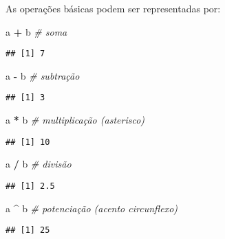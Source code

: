\documentclass[
]{book}
\newenvironment{Shaded}{\begin{snugshade}}{\end{snugshade}}
\newcommand{\CommentTok}[1]{\textcolor[rgb]{0.56,0.35,0.01}{\textit{#1}}}
\newcommand{\NormalTok}[1]{#1}
\newcommand{\OperatorTok}[1]{\textcolor[rgb]{0.81,0.36,0.00}{\textbf{#1}}}
\newcommand{\StringTok}[1]{\textcolor[rgb]{0.31,0.60,0.02}{#1}}
\begin{document}
As operações básicas podem ser representadas por:

\begin{Shaded}
\begin{Highlighting}[]
\NormalTok{a }\OperatorTok{+}\StringTok{ }\NormalTok{b }\CommentTok{# soma}
\end{Highlighting}
\end{Shaded}

\begin{verbatim}
## [1] 7
\end{verbatim}

\begin{Shaded}
\begin{Highlighting}[]
\NormalTok{a }\OperatorTok{-}\StringTok{ }\NormalTok{b }\CommentTok{# subtração}
\end{Highlighting}
\end{Shaded}

\begin{verbatim}
## [1] 3
\end{verbatim}

\begin{Shaded}
\begin{Highlighting}[]
\NormalTok{a }\OperatorTok{*}\StringTok{ }\NormalTok{b }\CommentTok{# multiplicação (asterisco)}
\end{Highlighting}
\end{Shaded}

\begin{verbatim}
## [1] 10
\end{verbatim}

\begin{Shaded}
\begin{Highlighting}[]
\NormalTok{a }\OperatorTok{/}\StringTok{ }\NormalTok{b }\CommentTok{# divisão}
\end{Highlighting}
\end{Shaded}

\begin{verbatim}
## [1] 2.5
\end{verbatim}

\begin{Shaded}
\begin{Highlighting}[]
\NormalTok{a }\OperatorTok{^}\StringTok{ }\NormalTok{b }\CommentTok{# potenciação (acento circunflexo)}
\end{Highlighting}
\end{Shaded}

\begin{verbatim}
## [1] 25
\end{verbatim}
\end{document}
